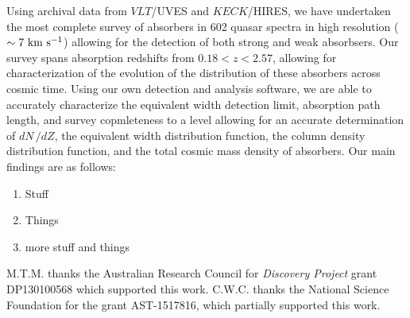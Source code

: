 \documentclass[linenumbers,twocolumn]{aastex61}
\begin{document}
Using archival data from $VLT$/UVES and $KECK$/HIRES, we have undertaken the most complete survey of {\CIV} absorbers in 602 quasar spectra in high resolution ($\sim 7~\mathrm{\hbox{km~s$^{-1}$}}$) allowing for the detection of both strong and weak {\CIV} absorbsers. Our survey spans absorption redshifts from $0.18 < z < 2.57$, allowing for characterization of the evolution of the distribution of these absorbers across cosmic time. Using our own detection and analysis software, we are able to accurately characterize the equivalent width detection limit, absorption path length, and survey copmleteness to a level allowing for an accurate determination of $dN\,/dZ$, the equivalent width distribution function, the column density distribution function, and the total cosmic mass density of {\CIV} absorbers. Our main findings are as follows:

\begin{enumerate}
\item Stuff
\item Things
\item more stuff and things
\end{enumerate}

M.T.M. thanks the Australian Research Council for \textsl{Discovery Project} grant DP130100568 which supported this work. C.W.C. thanks the National Science Foundation for the grant AST-1517816, which partially supported this work.



\end{document}
